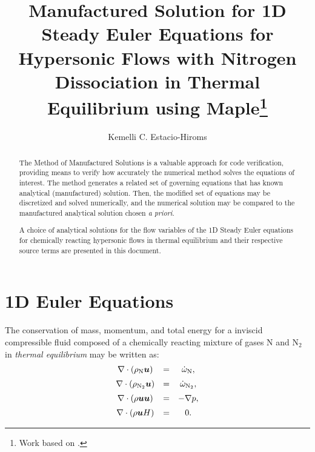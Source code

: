 \documentclass[10pt]{article}
\title{Manufactured Solution for 1D Steady Euler Equations for Hypersonic Flows with Nitrogen Dissociation in Thermal Equilibrium using Maple\footnote{Work based on \citet*{Roy2002,Kirk2009}.}}
\author{Kemelli C. Estacio-Hiroms}
\newcommand{\bv}[1]{\ensuremath{\mbox{\boldmath$ #1 $}}}
\begin{document}
\maketitle

\begin{abstract}
The Method of Manufactured Solutions is a valuable approach for code verification, providing means to verify how accurately the numerical method solves the equations of interest. The method generates a related set of governing equations that has known analytical (manufactured) solution. Then, the modified set of equations may be discretized and solved numerically, and the numerical solution may be compared to the manufactured analytical solution  chosen \textit{a priori}.

A choice of analytical solutions for the flow variables of the 1D Steady Euler equations for chemically reacting hypersonic flows in thermal equilibrium  and their respective source terms are presented in this document.
\end{abstract}





\section{1D Euler Equations}
The conservation of mass, momentum, and total energy for a inviscid compressible fluid composed of a chemically reacting mixture of gases N and N$_2$ in \textit{thermal equilibrium} may be written as:
\begin{equation}
\label{eq:euler01}
\begin{array}{ccc}
\nabla \cdot \left(\rho_{\text{N}} \bv{u}\right) &=& \dot{\omega}_{\text{N}},\vspace{5pt} \\
\nabla \cdot \left(\rho_{\text{N}_2}\bv{u}\right) &=& \dot{\omega}_{\text{N}_2},\vspace{5pt} \\
\nabla\cdot\left(\rho\bv{u}\bv{u}\right) &=& -\nabla p,\vspace{5pt} \\
\nabla\cdot\left(\rho \bv{u} H\right) &=& 0.
\end{array}
\end{equation}
\end{document}
